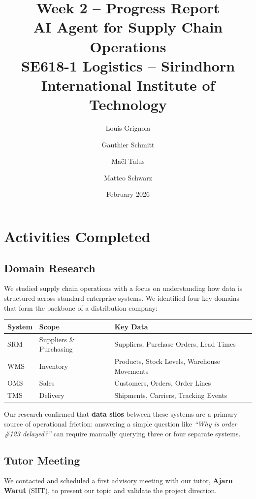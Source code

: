 \documentclass[11pt,a4paper]{article}
\title{
    \vspace{-1.5cm}
    \textbf{Week 2 -- Progress Report}\\[0.3em]
    \large AI Agent for Supply Chain Operations\\[0.2em]
    \large SE618-1 Logistics -- Sirindhorn International Institute of Technology
}
\author{
    Louis Grignola \and Gauthier Schmitt \and Ma\"el Talus \and Matteo Schwarz
}
\date{February 2026}
\begin{document}
\maketitle
\thispagestyle{fancy}

\section{Activities Completed}

\subsection{Domain Research}

We studied supply chain operations with a focus on understanding how data is structured across standard enterprise systems. We identified four key domains that form the backbone of a distribution company:

\begin{table}[h]
\centering\small
\begin{tabularx}{\textwidth}{@{}llX@{}}
\toprule
\textbf{System} & \textbf{Scope} & \textbf{Key Data} \\
\midrule
SRM & Suppliers \& Purchasing & Suppliers, Purchase Orders, Lead Times \\
WMS & Inventory              & Products, Stock Levels, Warehouse Movements \\
OMS & Sales                  & Customers, Orders, Order Lines \\
TMS & Delivery               & Shipments, Carriers, Tracking Events \\
\bottomrule
\end{tabularx}
\end{table}

\noindent Our research confirmed that \textbf{data silos} between these systems are a primary source of operational friction: answering a simple question like \textit{``Why is order \#123 delayed?''} can require manually querying three or four separate systems.

\subsection{Tutor Meeting}

We contacted and scheduled a first advisory meeting with our tutor, \textbf{Ajarn Warut} (SIIT), to present our topic and validate the project direction.
\end{document}
